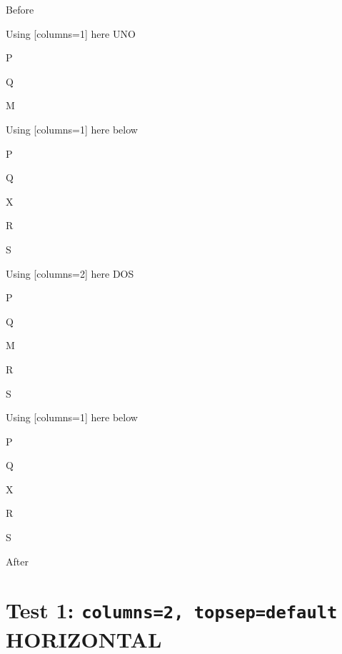 \documentclass[12pt]{article}
\begin{document}
Before
\begin{enumext}[columns=2,nosep]%

\item Using [columns=1] here UNO
  \begin{enumext}[columns=1,nosep]%
     \item  P \item Q \item M %
  \end{enumext}

\item Using [columns=1] here below
\begin{enumext}[columns=1]%
     \item  P \item Q \item X  \item R \item S
  \end{enumext}

\columnbreak

\item Using [columns=2] here DOS
  \begin{enumext}[columns=2,nosep]%
    \item  P \item Q \item M \item R \item S
  \end{enumext}

\item Using [columns=1] here below
\begin{enumext}[columns=1]%
     \item  P \item Q \item X  \item R \item S
  \end{enumext}

\end{enumext}
After

\newpage



\section{Test 1: \texttt{columns=2, topsep=default} HORIZONTAL}
\end{document}
